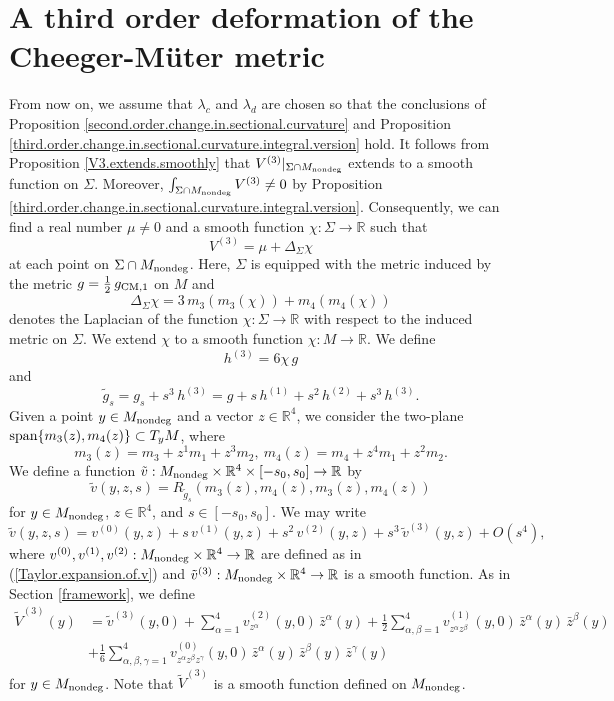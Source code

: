\documentclass[11pt]{amsart}
\theoremstyle{definition}
\begin{document}
\section{A third order deformation of the Cheeger-M\"uter metric}

\label{third.order.deformation}

From now on, we assume that $\lambda_c$ and $\lambda_d$ are chosen so that the conclusions of Proposition \ref{second.order.change.in.sectional.curvature} and Proposition \ref{third.order.change.in.sectional.curvature.integral.version} hold. It follows from Proposition \ref{V3.extends.smoothly} that $V^{(3)}|_{\Sigma \cap M_{\text{\rm nondeg}}}$ extends to a smooth function on $\Sigma$. Moreover, $\int_{\Sigma \cap M_{\text{\rm nondeg}}} V^{(3)} \neq 0$ by Proposition \ref{third.order.change.in.sectional.curvature.integral.version}. Consequently, we can find a real number $\mu \neq 0$ and a smooth function $\chi: \Sigma \to \mathbb{R}$ such that 
\begin{equation} 
\label{pde.for.chi}
V^{(3)} = \mu + \Delta_\Sigma \chi 
\end{equation}
at each point on $\Sigma \cap M_{\text{\rm nondeg}}$. Here, $\Sigma$ is equipped with the metric induced by the metric $g = \frac{1}{2} \, g_{\text{\rm CM},1}$ on $M$ and 
\[\Delta_\Sigma \chi = 3 \, m_3(m_3(\chi)) + m_4(m_4(\chi))\] 
denotes the Laplacian of the function $\chi: \Sigma \to \mathbb{R}$ with respect to the induced metric on $\Sigma$. We extend $\chi$ to a smooth function $\chi: M \to \mathbb{R}$. We define 
\[h^{(3)} = 6\chi \, g\] 
and 
\[\tilde{g}_s = g_s + s^3 \, h^{(3)} = g + s \, h^{(1)} + s^2 \, h^{(2)} + s^3 \, h^{(3)}.\]
Given a point $y \in M_{\text{\rm nondeg}}$ and a vector $z \in \mathbb{R}^4$, we consider the two-plane $\text{\rm span}\{m_3(z),m_4(z)\} \subset T_y M$, where 
\[ m_3(z)=m_3+z^1 m_1+z^3 m_2,\ m_4(z)=m_4+z^4 m_1+z^2 m_2. \] 
We define a function $\tilde{v}: M_{\text{\rm nondeg}} \times \mathbb{R}^4 \times [-s_0,s_0] \to \mathbb{R}$ by 
\[\tilde{v}(y,z,s) = R_{\tilde{g}_s}(m_3(z),m_4(z),m_3(z),m_4(z))\] 
for $y \in M_{\text{\rm nondeg}}$, $z \in \mathbb{R}^4$, and $s \in [-s_0,s_0]$. We may write 
\[\tilde{v}(y,z,s) = v^{(0)}(y,z) + s \, v^{(1)}(y,z) + s^2 \, v^{(2)}(y,z) + s^3 \, \tilde{v}^{(3)}(y,z) + O(s^4),\] 
where $v^{(0)},v^{(1)},v^{(2)}: M_{\text{\rm nondeg}} \times \mathbb{R}^4 \to \mathbb{R}$ are defined as in (\ref{Taylor.expansion.of.v}) and $\tilde{v}^{(3)}: M_{\text{\rm nondeg}} \times \mathbb{R}^4 \to \mathbb{R}$ is a smooth function. As in Section \ref{framework}, we define 
\begin{align*} 
\tilde{V}^{(3)}(y) 
&= \tilde{v}^{(3)}(y,0) + \sum_{\alpha=1}^4 v^{(2)}_{z^\alpha}(y,0) \, \bar{z}^\alpha(y) + \frac{1}{2} \sum_{\alpha,\beta=1}^4 v^{(1)}_{z^\alpha z^\beta}(y,0) \, \bar{z}^\alpha(y) \, \bar{z}^\beta(y) \\ 
&+ \frac{1}{6} \sum_{\alpha,\beta,\gamma=1}^4 v^{(0)}_{z^\alpha z^\beta z^\gamma}(y,0) \, \bar{z}^\alpha(y) \, \bar{z}^\beta(y) \, \bar{z}^\gamma(y) 
\end{align*}
for $y \in M_{\text{\rm nondeg}}$. Note that $\tilde{V}^{(3)}$ is a smooth function defined on $M_{\text{\rm nondeg}}$. 
\end{document}
